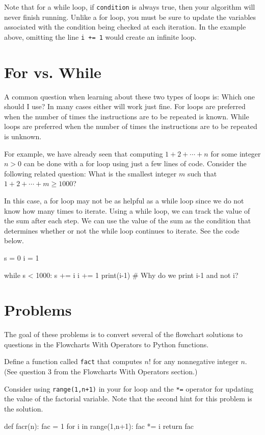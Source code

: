 \documentclass{ximera}
\begin{document}
Note that for a while loop, if \verb|condition| is always true, then your algorithm will never finish running. Unlike a for loop, you must be sure to update the variables associated with the condition being checked at each iteration. In the example above, omitting the line \verb|i += 1| would create an infinite loop.

\section{For vs. While}

A common question when learning about these two types of loops is: Which one should I use? In many cases either will work just fine. For loops are preferred when the number of times the instructions are to be repeated is known. While loops are preferred when the number of times the instructions are to be repeated is unknown.

For example, we have already seen that computing $1+2+\cdots+n$ for some integer $n>0$ can be done with a for loop using just a few lines of code. Consider the following related question: What is the smallest integer $m$ such that $1+2+\cdots+m\geq 1000$?

In this case, a for loop may not be as helpful as a while loop since we do not know how many times to iterate. Using a while loop, we can track the value of the sum after each step. We can use the value of the sum as the condition that determines whether or not the while loop continues to iterate. See the code below.

\begin{sageCell}
s = 0
i = 1

while s < 1000:
        s += i
        i += 1
print(i-1)  # Why do we print i-1 and not i?
\end{sageCell}

\section{Problems}

The goal of these problems is to convert several of the flowchart solutions to questions in the Flowcharts With Operators to Python functions.

\begin{question}
	Define a function called \verb|fact| that computes $n!$ for any nonnegative integer $n$. (See question 3 from the Flowcharts With Operators section.)
	\begin{hint}
	Consider using \verb|range(1,n+1)| in your for loop and the \verb|*=| operator for updating the value of the factorial variable. Note that the second hint for this problem is the solution.
	\end{hint}
	\begin{hint}
\begin{sageCell}
def facr(n):
        fac = 1
        for i in range(1,n+1):
                fac *= i
        return fac
\end{sageCell}
	\end{hint}
\end{question}
\end{document}
